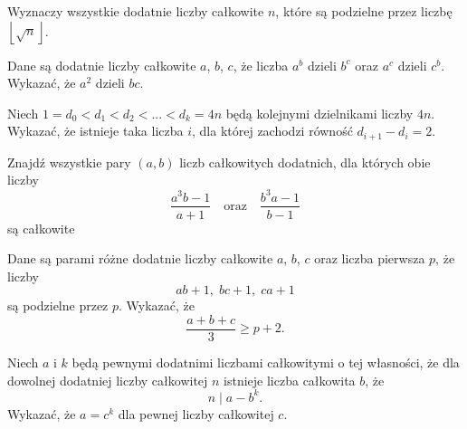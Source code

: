 \begin{problem}{1}
	Wyznaczy wszystkie dodatnie liczby całkowite $n$, które są podzielne przez liczbę~$\left\lfloor \sqrt{n} \right\rfloor$.
\end{problem}

\begin{problem}{2}
	Dane są dodatnie liczby całkowite $a$, $b$, $c$, że liczba $a^b$ dzieli $b^c$ oraz $a^c$ dzieli $c^b$. Wykazać, że $a^2$ dzieli $bc$.
\end{problem}

\begin{problem}{3}
	Niech $1 = d_0 < d_1 < d_2 < ... < d_k = 4n$ będą kolejnymi dzielnikami liczby $4n$. Wykazać, że istnieje taka liczba $i$, dla której zachodzi równość $d_{i + 1} - d_i = 2$.
\end{problem}

\begin{problem}{4}
	Znajdź wszystkie pary $(a, b)$ liczb całkowitych dodatnich, dla których obie liczby
	\[
		\frac{a^3b - 1}{a + 1} \quad \text{oraz} \quad \frac{b^3a - 1}{b - 1}
	\]
	są całkowite
\end{problem}

\begin{problem}{5}
	Dane są parami różne dodatnie liczby całkowite $a$, $b$, $c$ oraz liczba pierwsza $p$, że liczby
	\[
		ab + 1, \; bc + 1, \; ca + 1
	\] 
	są podzielne przez $p$. Wykazać, że
	\[
		\frac{a + b + c}{3} \geqslant p + 2.
	\]
\end{problem}

\begin{problem}{6}
	Niech $a$ i $k$ będą pewnymi dodatnimi liczbami całkowitymi o tej własności, że dla dowolnej dodatniej liczby całkowitej $n$ istnieje liczba całkowita $b$, że
	\[
		n \mid a - b^k.
	\]
	Wykazać, że $a = c^k$ dla pewnej liczby całkowitej $c$.
\end{problem}

